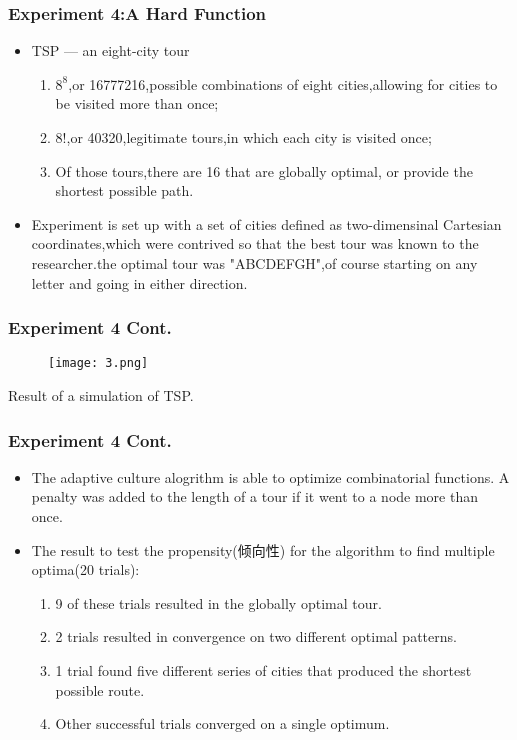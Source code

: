 \documentclass[CJK]{beamer}
\begin{document}
\begin{CJK*}{GBK}{song}
\begin{frame}
\frametitle{Experiment 4:A Hard Function}
\begin{itemize}
\item{TSP --- an eight-city tour}
\begin{enumerate}
\item{$8^{8}$,or 16777216,possible combinations of eight cities,allowing for cities to be visited more than once;}
\item{8!,or 40320,legitimate tours,in which each city is visited once;}
\item{Of those tours,there are 16 that are globally optimal, or provide the shortest possible path.}
\end{enumerate}
\item{Experiment is set up with a set of cities defined as two-dimensinal Cartesian coordinates,which were contrived so that the best tour was known to the researcher.the optimal tour was "ABCDEFGH",of course starting on any letter and going in either direction.}
\end{itemize}
\end{frame}

\begin{frame}
\frametitle{Experiment 4 Cont.}
\begin{center}
\begin{figure}
\texttt{[image: 3.png]}\\
\end{figure}
Result of a simulation of TSP.
\end{center}
\end{frame}

\begin{frame}
\frametitle{Experiment 4 Cont.}
\begin{itemize}
\item{The adaptive culture alogrithm is able to optimize combinatorial functions. A penalty was added to the length of a tour if it went to a node more than once.}
\item{The result to test the propensity(倾向性) for the algorithm to find multiple optima(20 trials): }
\begin{enumerate}
\item{9 of these trials resulted in the globally optimal tour.}
\item{2 trials resulted in convergence on two different optimal patterns.}
\item{1 trial found five different series of cities that produced the shortest possible route.}
\item{Other successful trials converged on a single optimum.}
\end{enumerate}
\end{itemize}
\end{frame}


\end{CJK*}
\end{document}
